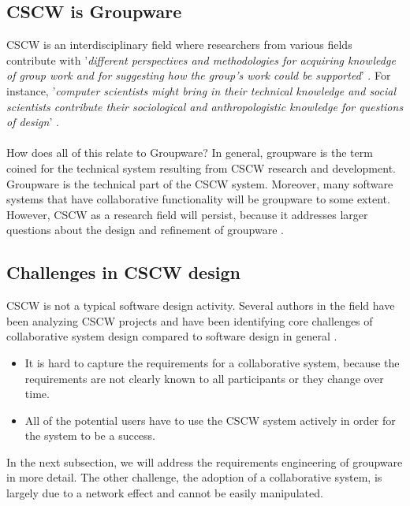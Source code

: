 \subsection{CSCW is Groupware}

CSCW is an interdisciplinary field where researchers from various fields contribute with '\textit{different perspectives and methodologies for acquiring knowledge of group work and for suggesting how the group's work could be supported}' \cite{CSCWGroupware}. For instance, '\textit{computer scientists might bring in their technical knowledge and social scientists contribute their sociological and anthropologistic knowledge for questions of design}' \cite{CSCWMethodology}.
\\ \\
How does all of this relate to Groupware? In general, groupware is the term coined for the technical system resulting from CSCW research and development. Groupware is the technical part of the CSCW system. Moreover, many software systems that have collaborative functionality will be groupware to some extent. However, CSCW as a research field will persist, because it addresses larger questions about the design and refinement of groupware \cite{CSCWReadings}.

\subsection{Challenges in CSCW design}

CSCW is not a typical software design activity. Several authors in the field have been analyzing CSCW projects and have been identifying core challenges of collaborative system design compared to software design in general \cite{CSCWConcepts}. 

\begin{itemize}
\item{It is hard to capture the requirements for a collaborative system, because the requirements are not clearly known to all participants or they change over time.}
\item{All of the potential users have to use the CSCW system actively in order for the system to be a success.}
\end{itemize}

In the next subsection, we will address the requirements engineering of groupware in more detail. The other challenge, the adoption of a collaborative system, is largely due to a network effect and cannot be easily manipulated.

